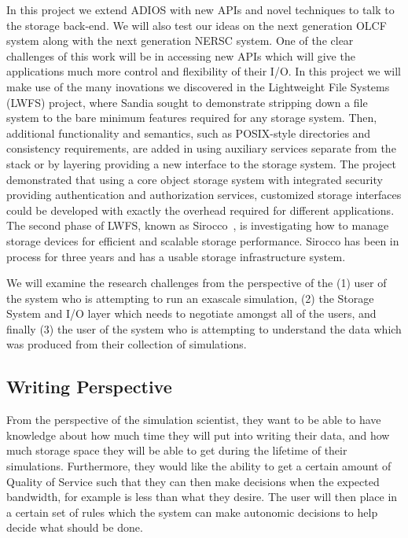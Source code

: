 In this project we extend ADIOS with new APIs and novel techniques to talk to the
storage back-end. We will also test our ideas on the next generation OLCF system along with
the next generation NERSC system. One of the clear challenges of this work will be in accessing new APIs which
will give the applications much more control and flexibility of their I/O.
%
In this project we will make use of the many inovations we discovered in 
the Lightweight File Systems~\cite{lwfs} (LWFS) project, where Sandia sought to
demonstrate stripping down a file system to the bare minimum features required
for any storage system. Then, additional functionality and semantics, such as
POSIX-style directories and consistency requirements, are added in using
auxiliary services separate from the stack or by layering providing a new
interface to the storage system. The project demonstrated that using a core
object storage system with integrated security providing authentication and
authorization services, customized storage interfaces could be developed with
exactly the overhead required for different applications. The second phase of
LWFS, known as Sirocco~\cite{sirocco}, is investigating how to manage storage
devices for efficient and scalable storage performance.  Sirocco has been in
process for three years and has a usable storage infrastructure system.




We will examine the research challenges from the perspective of the
%
(1) user of the system who is attempting to run an exascale simulation,
%
(2) the Storage System and I/O layer which needs to negotiate amongst all of
the users, and finally
%
(3) the user of the system who is attempting to understand the data which
was produced from their collection of simulations.

\subsection{Writing Perspective}
\label{subsec:sim-perspective}
From the perspective of the simulation scientist, they want to be able to
have knowledge about how much time they will put into writing their data,
and how much storage space they will be able to get during the lifetime of
their simulations. Furthermore, they would like the ability to get a certain
amount of Quality of Service such that they can then make decisions when the
expected bandwidth, for example is less than what they desire. The user will
then place in a certain set of rules which the system can make autonomic
decisions to help decide what should be done.
%

